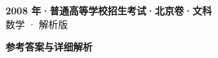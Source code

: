 \documentclass[zihao=-4, a4paper]{ctexart}
\begin{document}
\begin{center}
  {\Large\bfseries 2008 年·普通高等学校招生考试·北京卷·文科}\\[4pt]
  {\large 数学 · 解析版}
\end{center}
\medskip
{}

\clearpage
{}
\begin{center}{\Large\bfseries 参考答案与详细解析}\end{center}
\medskip

\end{document}
